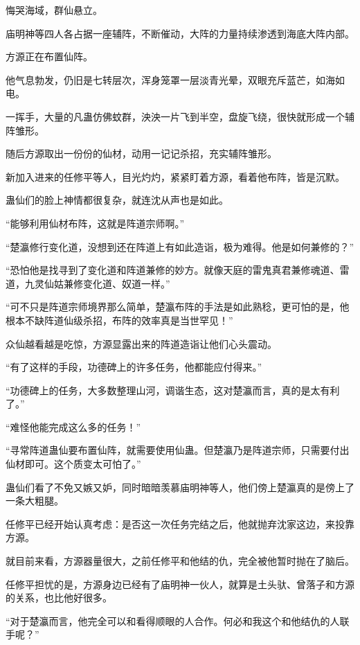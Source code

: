 
\begin{this_body}



悔哭海域，群仙悬立。

庙明神等四人各占据一座辅阵，不断催动，大阵的力量持续渗透到海底大阵内部。

方源正在布置仙阵。

他气息勃发，仍旧是七转层次，浑身笼罩一层淡青光晕，双眼充斥蓝芒，如海如电。

一挥手，大量的凡蛊仿佛蚊群，泱泱一片飞到半空，盘旋飞绕，很快就形成一个辅阵雏形。

随后方源取出一份份的仙材，动用一记记杀招，充实辅阵雏形。

新加入进来的任修平等人，目光灼灼，紧紧盯着方源，看着他布阵，皆是沉默。

蛊仙们的脸上神情都很复杂，就连沈从声也是如此。

“能够利用仙材布阵，这就是阵道宗师啊。”

“楚瀛修行变化道，没想到还在阵道上有如此造诣，极为难得。他是如何兼修的？”

“恐怕他是找寻到了变化道和阵道兼修的妙方。就像天庭的雷鬼真君兼修魂道、雷道，九灵仙姑兼修变化道、奴道一样。”

“可不只是阵道宗师境界那么简单，楚瀛布阵的手法是如此熟稔，更可怕的是，他根本不缺阵道仙级杀招，布阵的效率真是当世罕见！”

众仙越看越是吃惊，方源显露出来的阵道造诣让他们心头震动。

“有了这样的手段，功德碑上的许多任务，他都能应付得来。”

“功德碑上的任务，大多数整理山河，调谐生态，这对楚瀛而言，真的是太有利了。”

“难怪他能完成这么多的任务！”

“寻常阵道蛊仙要布置仙阵，就需要使用仙蛊。但楚瀛乃是阵道宗师，只需要付出仙材即可。这个质变太可怕了。”

蛊仙们看了不免又嫉又妒，同时暗暗羡慕庙明神等人，他们傍上楚瀛真的是傍上了一条大粗腿。

任修平已经开始认真考虑：是否这一次任务完结之后，他就抛弃沈家这边，来投靠方源。

就目前来看，方源器量很大，之前任修平和他结的仇，完全被他暂时抛在了脑后。

任修平担忧的是，方源身边已经有了庙明神一伙人，就算是土头驮、曾落子和方源的关系，也比他好很多。

“对于楚瀛而言，他完全可以和看得顺眼的人合作。何必和我这个和他结仇的人联手呢？”


\end{this_body}
